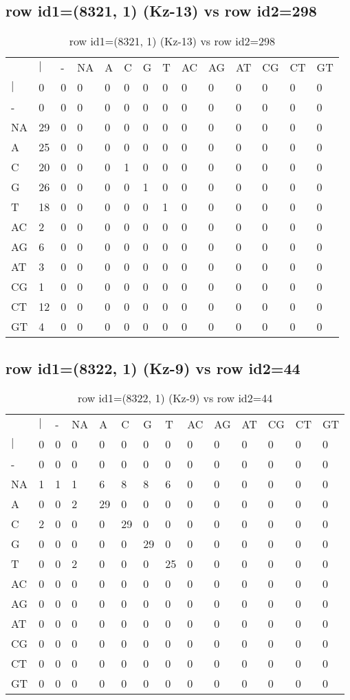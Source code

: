 \subsection{row id1=(8321, 1) (Kz-13) vs row id2=298}
\begin{center}
\begin{longtable}{|l|l|l|l|l|l|l|l|l|l|l|l|l|l|}
\caption{row id1=(8321, 1) (Kz-13) vs row id2=298} \label{table_dm514}\\
\hline
\\
\hline
&$|$&-&NA&A&C&G&T&AC&AG&AT&CG&CT&GT\\
$|$&0&0&0&0&0&0&0&0&0&0&0&0&0\\
-&0&0&0&0&0&0&0&0&0&0&0&0&0\\
NA&29&0&0&0&0&0&0&0&0&0&0&0&0\\
A&25&0&0&0&0&0&0&0&0&0&0&0&0\\
C&20&0&0&0&1&0&0&0&0&0&0&0&0\\
G&26&0&0&0&0&1&0&0&0&0&0&0&0\\
T&18&0&0&0&0&0&1&0&0&0&0&0&0\\
AC&2&0&0&0&0&0&0&0&0&0&0&0&0\\
AG&6&0&0&0&0&0&0&0&0&0&0&0&0\\
AT&3&0&0&0&0&0&0&0&0&0&0&0&0\\
CG&1&0&0&0&0&0&0&0&0&0&0&0&0\\
CT&12&0&0&0&0&0&0&0&0&0&0&0&0\\
GT&4&0&0&0&0&0&0&0&0&0&0&0&0\\
\hline
\end{longtable}
\end{center}

\subsection{row id1=(8322, 1) (Kz-9) vs row id2=44}
\begin{center}
\begin{longtable}{|l|l|l|l|l|l|l|l|l|l|l|l|l|l|}
\caption{row id1=(8322, 1) (Kz-9) vs row id2=44} \label{table_dm516}\\
\hline
\\
\hline
&$|$&-&NA&A&C&G&T&AC&AG&AT&CG&CT&GT\\
$|$&0&0&0&0&0&0&0&0&0&0&0&0&0\\
-&0&0&0&0&0&0&0&0&0&0&0&0&0\\
NA&1&1&1&6&8&8&6&0&0&0&0&0&0\\
A&0&0&2&29&0&0&0&0&0&0&0&0&0\\
C&2&0&0&0&29&0&0&0&0&0&0&0&0\\
G&0&0&0&0&0&29&0&0&0&0&0&0&0\\
T&0&0&2&0&0&0&25&0&0&0&0&0&0\\
AC&0&0&0&0&0&0&0&0&0&0&0&0&0\\
AG&0&0&0&0&0&0&0&0&0&0&0&0&0\\
AT&0&0&0&0&0&0&0&0&0&0&0&0&0\\
CG&0&0&0&0&0&0&0&0&0&0&0&0&0\\
CT&0&0&0&0&0&0&0&0&0&0&0&0&0\\
GT&0&0&0&0&0&0&0&0&0&0&0&0&0\\
\hline
\end{longtable}
\end{center}


